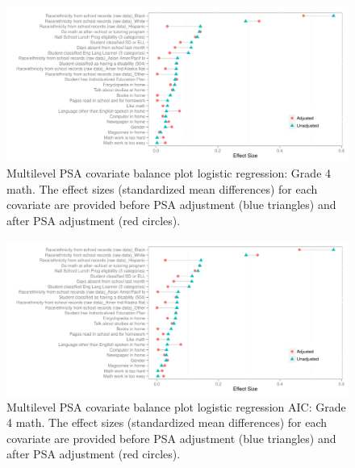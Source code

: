 \begin{figure}[h!]
\begin{center}
\includegraphics[width=\textwidth]{../Figures2009/g4math-mlpsa-lr-balance.pdf}
\caption[Multilevel PSA covariate balance plot logistic regression: Grade 4 math]{Multilevel PSA covariate balance plot logistic regression: Grade 4 math. The effect sizes (standardized mean differences) for each covariate are provided before PSA adjustment (blue triangles) and after PSA adjustment (red circles).}
\end{center}
\end{figure}

\begin{figure}[h!]
\begin{center}
\includegraphics[width=\textwidth]{../Figures2009/g4math-mlpsa-lrAIC-balance.pdf}
\caption[Multilevel PSA covariate balance plot logistic regression AIC: Grade 4 math]{Multilevel PSA covariate balance plot logistic regression AIC: Grade 4 math. The effect sizes (standardized mean differences) for each covariate are provided before PSA adjustment (blue triangles) and after PSA adjustment (red circles).}
\end{center}
\end{figure}

